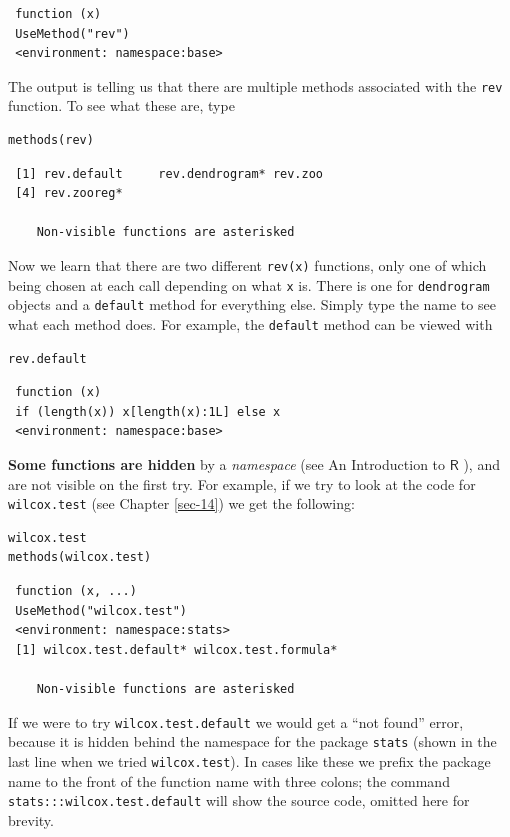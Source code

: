 \documentclass[captions=tableheading]{scrbook}
\begin{document}
\begin{verbatim}
 function (x) 
 UseMethod("rev")
 <environment: namespace:base>
\end{verbatim}

The output is telling us that there are multiple methods associated with the \texttt{rev} function. To see what these are, type


\begin{verbatim}
methods(rev)
\end{verbatim}

\begin{verbatim}
 [1] rev.default     rev.dendrogram* rev.zoo        
 [4] rev.zooreg*    
 
    Non-visible functions are asterisked
\end{verbatim}

Now we learn that there are two different \texttt{rev(x)} functions, only one of which being chosen at each call depending on what \texttt{x} is. There is one for \texttt{dendrogram} objects and a \texttt{default} method for everything else. Simply type the name to see what each method does. For example, the \texttt{default} method can be viewed with


\begin{verbatim}
rev.default
\end{verbatim}

\begin{verbatim}
 function (x) 
 if (length(x)) x[length(x):1L] else x
 <environment: namespace:base>
\end{verbatim}

\textbf{Some functions are hidden} by a \emph{namespace} (see An Introduction to \(\mathsf{R}\) \cite{Venables2010}), and are not visible on the first try. For example, if we try to look at the code for \texttt{wilcox.test} (see Chapter \ref{sec-14}) we get the following:


\begin{verbatim}
wilcox.test
methods(wilcox.test)
\end{verbatim}

\begin{verbatim}
 function (x, ...) 
 UseMethod("wilcox.test")
 <environment: namespace:stats>
 [1] wilcox.test.default* wilcox.test.formula*
 
    Non-visible functions are asterisked
\end{verbatim}

If we were to try \texttt{wilcox.test.default}  we would get a ``not found'' error, because it is hidden behind the namespace for the package \texttt{stats} (shown in the last line when we tried \texttt{wilcox.test}). In cases like these we prefix the package name to the front of the function name with three colons; the command \texttt{stats:::wilcox.test.default} will show the source code, omitted here for brevity.
\end{document}
